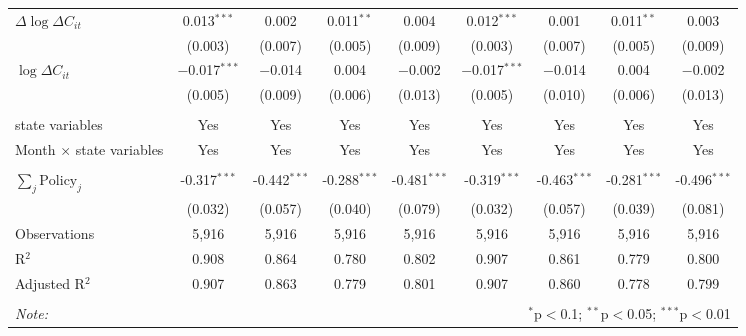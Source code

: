\begin{tabular}{@{\extracolsep{1pt}}lcccccccc}
  $\Delta \log \Delta C_{it}$ & 0.013$^{***}$ & 0.002 & 0.011$^{**}$ & 0.004 & 0.012$^{***}$ & 0.001 & 0.011$^{**}$ & 0.003 \\ 
  & (0.003) & (0.007) & (0.005) & (0.009) & (0.003) & (0.007) & (0.005) & (0.009) \\ 
  $\log \Delta C_{it}$ & $-$0.017$^{***}$ & $-$0.014 & 0.004 & $-$0.002 & $-$0.017$^{***}$ & $-$0.014 & 0.004 & $-$0.002 \\ 
  & (0.005) & (0.009) & (0.006) & (0.013) & (0.005) & (0.010) & (0.006) & (0.013) \\ 
 \hline \\[-1.8ex] 
state variables & Yes & Yes & Yes & Yes & Yes & Yes & Yes & Yes \\ 
Month $\times$ state variables & Yes & Yes & Yes & Yes & Yes & Yes & Yes & Yes \\ 
\hline \\[-1.8ex] 
$\sum_j \mathrm{Policy}_j$ & -0.317$^{***}$ & -0.442$^{***}$ & -0.288$^{***}$ & -0.481$^{***}$ & -0.319$^{***}$ & -0.463$^{***}$ & -0.281$^{***}$ & -0.496$^{***}$ \\ 
 & (0.032) & (0.057) & (0.040) & (0.079) & (0.032) & (0.057) & (0.039) & (0.081) \\ 
Observations & 5,916 & 5,916 & 5,916 & 5,916 & 5,916 & 5,916 & 5,916 & 5,916 \\ 
R$^{2}$ & 0.908 & 0.864 & 0.780 & 0.802 & 0.907 & 0.861 & 0.779 & 0.800 \\ 
Adjusted R$^{2}$ & 0.907 & 0.863 & 0.779 & 0.801 & 0.907 & 0.860 & 0.778 & 0.799 \\ 
\hline 
\hline \\[-1.8ex] 
\textit{Note:}  & \multicolumn{8}{r}{$^{*}$p$<$0.1; $^{**}$p$<$0.05; $^{***}$p$<$0.01} \\ 
\end{tabular} 